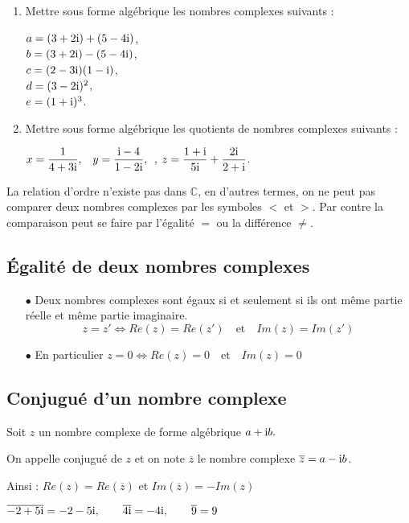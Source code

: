 \begin{exercice}
\begin{enumerate}
\item Mettre sous forme algébrique  les nombres complexes suivants :

\medskip 

$ a=(3 + 2\text{i}) + (5 - 4\text{i}) $,\\ $ b=(3 + 2\text{i}) - (5 - 4\text{i}) $,\\ $ c=(2 - 3\text{i})(1 - \text{i}) $,\\ $ d=(3 - 2\text{i})^2$,\\ $ e=(1 + \text{i})^3$. 

\item Mettre sous forme algébrique  les quotients de nombres complexes suivants :

\medskip 

$ x=\dfrac{1}{4+3\text{i}} ,\;\;$ $ y=\dfrac{\text{i}-4}{1-2\text{i}},\;\; $, $ z=\dfrac{1+\text{i}}{5\text{i}} +\dfrac{2\text{i}}{2+\text{i}}$.
\end{enumerate}

\end{exercice}
\begin{remark}
 La relation d'ordre n'existe pas dans $ \mathbb{C} $, en d'autres termes, on ne peut pas comparer deux nombres complexes par les symboles $ <$ et $ >$. Par contre la comparaison peut se faire par l'égalité  $ =$ ou  la différence $ \neq$.
 \end{remark}
\subsection*{Égalité de deux nombres complexes}
\begin{itemize}
\item[$  \bullet$] Deux nombres complexes sont égaux si et seulement si ils ont même partie
réelle et même partie imaginaire.
\[z=z' \Longleftrightarrow Re(z)=Re(z')\quad \text{et}\quad Im(z)=Im(z')\]
\item[$  \bullet$] En particulier $ z=0 \Longleftrightarrow Re(z)=0\quad \text{et}\quad Im(z)=0$
\end{itemize}

\subsection*{Conjugué d'un nombre complexe}
\begin{definition}
Soit $ z $ un nombre complexe de forme algébrique  $ a+ \text{i} b.$

\medskip

On appelle conjugué de $ z $ et on note $ \overline{z} $ le nombre complexe $ \overline{z} =a- \text{i} b$.

\medskip

Ainsi :  $ Re(z)=Re(\overline{z}) $ et $ Im(\overline{z})=-Im(z) $

\end{definition}
\begin{example}
 $ \overline{-2+5\text{i}} =-2-5\text{i},
\qquad  \overline{4\text{i}} =-4\text{i},\qquad 
 \overline{9} =9$
\end{example}
\medskip

